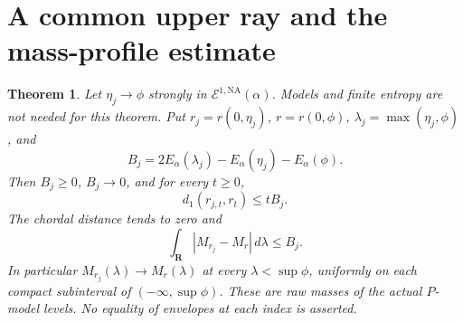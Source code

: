 \documentclass[11pt]{article}
\newcommand{\NA}{\mathrm{NA}}
\newcommand{\cE}{\mathcal E}
\newtheorem{theorem}{Theorem}
\theoremstyle{remark}\newtheorem{remark}[theorem]{Remark}
\begin{document}
\section{A common upper ray and the mass-profile estimate}
\begin{theorem}\label{thm:profiles}
Let $\eta_j\to\phi$ strongly in $\cE^{1,\NA}(\alpha)$. Models
and finite entropy are not needed for this theorem. Put
$r_j=r(0,\eta_j)$, $r=r(0,\phi)$,
$\lambda_j=\max(\eta_j,\phi)$, and
\[
 B_j=2E_\alpha(\lambda_j)-E_\alpha(\eta_j)-E_\alpha(\phi).
\]
Then $B_j\geq0$, $B_j\to0$, and for every $t\geq0$,
\begin{equation}\label{eq:ray-bound}
 d_1(r_{j,t},r_t)\leq tB_j.
\end{equation}
The chordal distance tends to zero and
\begin{equation}\label{eq:mass-bound}
 \int_{\mathbf R}|M_{r_j}-M_r|\,d\lambda\leq B_j.
\end{equation}
In particular $M_{r_j}(\lambda)\to M_r(\lambda)$ at every
$\lambda<\sup\phi$, uniformly on each compact subinterval of
$(-\infty,\sup\phi)$. These are raw masses of the actual
$P$-model levels. No equality of envelopes at each index is asserted.
\end{theorem}
\end{document}
